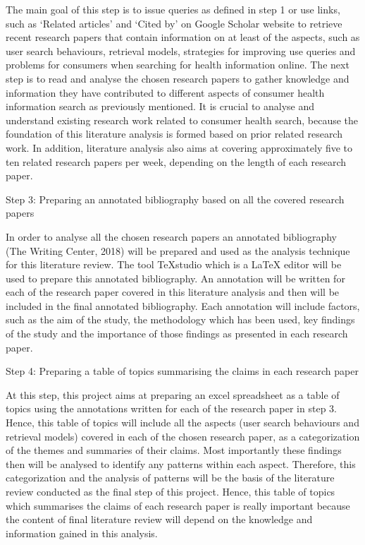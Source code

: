 \documentclass[]{article}
\begin{document}
The main goal of this step is to issue queries as defined in step 1 or use links, such as ‘Related articles’ and ‘Cited by’ on Google Scholar website to retrieve recent research papers that contain information on at least of the aspects, such as user search behaviours, retrieval models, strategies for improving use queries and problems for consumers when searching for health information online. The next step is to read and analyse the chosen research papers to gather knowledge and information they have contributed to different aspects of consumer health information search as previously mentioned. It is crucial to analyse and understand existing research work related to consumer health search, because the foundation of this literature analysis is formed based on prior related research work. In addition, literature analysis also aims at covering approximately five to ten related research papers per week, depending on the length of each research paper.             

Step 3: Preparing an annotated bibliography based on all the covered research papers 

In order to analyse all the chosen research papers an annotated bibliography (The Writing Center, 2018) will be prepared and used as the analysis technique for this literature review. The tool TeXstudio which is a LaTeX editor will be used to prepare this annotated bibliography. An annotation will be written for each of the research paper covered in this literature analysis and then will be included in the final annotated bibliography. Each annotation will include factors, such as the aim of the study, the methodology which has been used, key findings of the study and the importance of those findings as presented in each research paper. 

Step 4: Preparing a table of topics summarising the claims in each research paper

At this step, this project aims at preparing an excel spreadsheet as a table of topics using the annotations written for each of the research paper in step 3. Hence, this table of topics will include all the aspects (user search behaviours and retrieval models) covered in each of the chosen research paper, as a categorization of the themes and summaries of their claims. Most importantly these findings then will be analysed to identify any patterns within each aspect. Therefore, this categorization and the analysis of patterns will be the basis of the literature review conducted as the final step of this project.  Hence, this table of topics which summarises the claims of each research paper is really important because the content of final literature review will depend on the knowledge and information gained in this analysis. 
\end{document}
